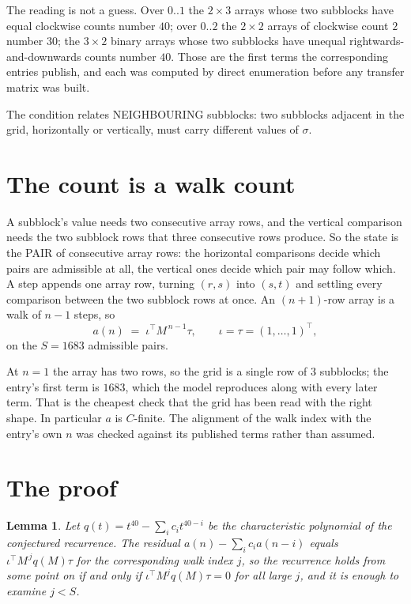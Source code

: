\documentclass[11pt,a4paper]{article}
\theoremstyle{plain}
\newtheorem{lemma}[theorem]{Lemma}
\theoremstyle{definition}
\begin{document}
The reading is not a guess. Over $0..1$ the $2\times3$ arrays whose two subblocks have equal
clockwise counts number $40$; over $0..2$ the $2\times2$ arrays of clockwise count $2$ number
$30$; the $3\times2$ binary arrays whose two subblocks have unequal rightwards-and-downwards
counts number $40$. Those are the first terms the corresponding entries publish, and each was
computed by direct enumeration before any transfer matrix was built.

The condition relates NEIGHBOURING subblocks: two subblocks adjacent in the grid, horizontally
or vertically, must carry different values of $\sigma$.

\section{The count is a walk count}

A subblock's value needs two consecutive array rows, and the vertical
comparison needs the two subblock rows that three consecutive rows produce. So the state is the
PAIR of consecutive array rows: the horizontal comparisons decide which pairs are admissible at
all, the vertical ones decide which pair may follow which. A step appends one array row,
turning $(r,s)$ into $(s,t)$ and settling every comparison between the two subblock rows at
once. An $(n+1)$-row array is a walk of $n-1$ steps, so
\[
a(n)\;=\;\iota^{\!\top}M^{\,n-1}\tau,\qquad\iota=\tau=(1,\dots,1)^{\!\top},
\]
on the $S=1683$ admissible pairs.

At $n=1$ the array has two rows, so the grid is a single row of $3$
subblocks; the entry's first term is $1683$, which the model
reproduces along with every later term. That is the cheapest check that the grid has been read
with the right shape.
In particular $a$ is $C$-finite. The alignment of the walk index with the entry's own $n$ was
checked against its published terms rather than assumed.

\section{The proof}

\begin{lemma}\label{lem:crit}
Let $q(t)=t^{40}-\sum_i c_it^{40-i}$ be the characteristic polynomial of the
conjectured recurrence. The residual $a(n)-\sum_ic_ia(n-i)$ equals
$\iota^{\!\top}M^{\,j}q(M)\tau$ for the corresponding walk index $j$, so the recurrence
holds from some point on if and only if $\iota^{\!\top}M^{j}q(M)\tau=0$ for all large $j$,
and it is enough to examine $j<S$.
\end{lemma}
\end{document}
